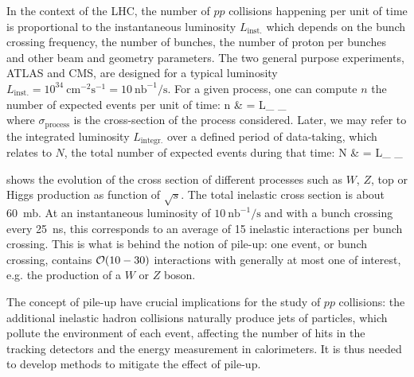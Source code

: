     In the context of the LHC, the number of $pp$ collisions happening per unit of time is
    proportional to the instantaneous luminosity $L_\text{inst.}$ which depends on the bunch crossing
    frequency, the number of bunches, the number of proton per bunches and other beam and
    geometry parameters. The two general purpose experiments, ATLAS and CMS, are designed
    for a typical luminosity $L_\text{inst.} = 10^{34}~\text{cm}^{-2}
    \text{s}^{-1} = 10~\text{nb}^{-1} / \text{s}$. For a given process, one can compute $n$
    the number of expected events per unit of time:
    {
        n & = L_ \times \sigma_ \\
    }
    where $\sigma_\text{process}$ is the cross-section of the process considered. Later, we may refer
    to the integrated luminosity $L_\text{integr.}$ over a defined period of data-taking,
    which relates to $N$, the total number of expected events during that time:
    {
        N & = L_ \times \sigma_
    }

     shows the evolution of the cross section of different
    processes such as $W$, $Z$, top or Higgs production as function of $\sqrt{s}$. The
    total inelastic cross section is about 60~mb. At an instantaneous luminosity of
    $10~\text{nb}^{-1} / \text{s}$ and with a bunch crossing every 25~ns, this corresponds
    to an average of 15 inelastic interactions per bunch crossing. This is what is behind
    the notion of pile-up: one event, or bunch crossing, contains $\mathcal{O}(10-30)$ interactions
    with generally at most one of interest, e.g. the production of a $W$ or $Z$ boson.


    The concept of pile-up have crucial implications for the study of $pp$ collisions: the
    additional inelastic hadron collisions naturally produce jets of particles, which
    pollute the environment of each event, affecting the number of hits in the tracking
    detectors and the energy measurement in calorimeters. It is thus needed to develop
    methods to mitigate the effect of pile-up.

